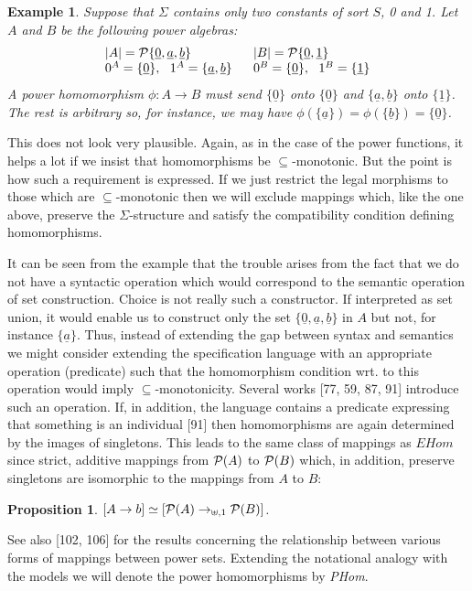 \documentclass[10pt]{article}
\newcommand{\Car}[1]{|#1|}
\newcommand{\PSet}{{\cal P}}
\newcommand{\into}{\mathrel{\rightarrow}}
\newcommand{\iso}{\mathrel{\simeq}}
\newcommand{\und}[1]{\underline{#1}}
\newcounter{CLAIM}[section]
\newtheorem{Claim}[CLAIM]{Proposition}
\newtheorem{Example}[CLAIM]{Example}
\begin{document}
\begin{Example}\label{ex:212} %
Suppose that 
$\Sigma$ contains only two constants of sort $S$, 0 and 1. Let 
$A$ and $B$ be the following power algebras: 
\[ \begin{array}{l@{\ \ \ \ \ }l}
\Car A = \PSet\{\und 0, \und a, \und b\} & \Car B = \PSet\{\und 0, 
\und 1\} \\
0^{A}=\{\und 0\},\ \ 1^{A}=\{\und a, \und b\} & 
  0^{B}=\{\und 0\},\ \ 1^{B}=\{\und 1\} 
  \end{array}
\]
\noindent
A power homomorphism  $\phi:A\into B$ must send 
$\{\und 0\}$ onto $\{\und 0\}$ and $\{\und a,\und b\}$ onto $\{\und 
1\}$.  The rest is arbitrary so, for instance, 
we may have $\phi(\{\und a\}) = \phi(\{\und b\}) = \{\und 0\}$. 
\end{Example}

This does not look very plausible. 
Again, as in the case of the power functions, it helps a lot if we 
insist that homomorphisms be $\subseteq$-monotonic. 
But the point is how such a requirement is expressed. If 
we just restrict the legal morphisms to those which are $\subseteq$-monotonic 
then we will exclude mappings which, like the one 
above, preserve the $\Sigma$-structure and satisfy the compatibility condition defining 
homomorphisms.


It can be seen from the example that the trouble arises from the fact 
that we do not have a syntactic operation which would correspond to 
the semantic operation of set construction. Choice is not really such 
a constructor. If interpreted as set union, it would enable us to construct 
only the set $\{\und 0, \und a, \und b\}$ in $A$ but not, for instance 
$\{\und a\}$. Thus, 
instead of extending the gap between syntax and semantics we might 
consider extending the specification language with an appropriate 
operation (predicate) such that the 
homomorphism condition wrt. to this operation would imply 
$\subseteq$-monotonicity. Several works [77, 59, 87, 91] introduce such an 
operation. If, in addition, the language contains a predicate 
expressing that something is an individual [91] then homomorphisms 
are again determined by the images of singletons. This leads to
 the same class of mappings as $EHom$ since strict, additive mappings 
from $\PSet(A)$ to $\PSet(B)$ which, in addition, preserve singletons 
are isomorphic to the mappings from $A$ to $B$:
\begin{Claim} %
$[A\into b]\iso [\PSet(A)\into_{\uplus,1}\PSet(B)]$.
\end{Claim} 
See also [102, 106] for the 
results concerning the relationship between various forms of mappings 
between power sets. Extending the notational analogy with the models 
we will denote the power homomorphisms by {\em PHom}.
\end{document}
